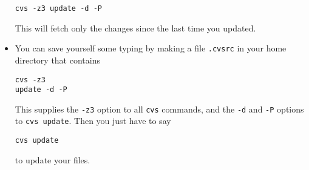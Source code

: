 \begin{itemize}
\begin{verbatim}
cvs -z3 update -d -P
\end{verbatim}

     This will fetch only the changes since the last time you updated.

\item
     You can save yourself some typing by making a file \verb+.cvsrc+
     in your home directory that contains

\begin{verbatim}
cvs -z3
update -d -P
\end{verbatim}

     This supplies the \verb+-z3+ option to all \verb+cvs+ commands, and the
     \verb+-d+ and \verb+-P+ options to \verb+cvs update+.  Then you just have
     to say

\begin{verbatim}
cvs update
\end{verbatim}

     to update your files.

\end{itemize}
